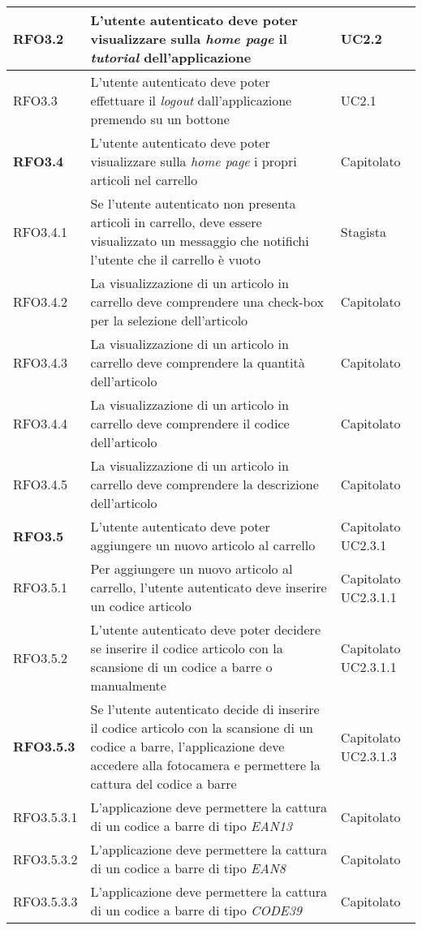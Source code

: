 {\begin{center}
\begin{longtable}{ | >{\centering\arraybackslash}p{2.5cm} | >{\arraybackslash}p{7cm} | >{\centering\arraybackslash}p{2cm} | }
RFO3.2 & L'utente autenticato deve poter visualizzare sulla \textit{home page} il \textit{tutorial} dell'applicazione & UC2.2 \\ \hline
RFO3.3 & L'utente autenticato deve poter effettuare il \textit{logout} dall'applicazione premendo su un bottone & UC2.1 \\ \hline
\textbf{RFO3.4} & L'utente autenticato deve poter visualizzare sulla \textit{home page} i propri articoli nel carrello & Capitolato \\ \hline
RFO3.4.1 & Se l'utente autenticato non presenta articoli in carrello, deve essere visualizzato un messaggio che notifichi l'utente che il carrello è vuoto & Stagista \\ \hline
RFO3.4.2 & La visualizzazione di un articolo in carrello deve comprendere una check-box per la selezione dell'articolo & Capitolato \\ \hline
RFO3.4.3 & La visualizzazione di un articolo in carrello deve comprendere la quantità dell'articolo & Capitolato \\ \hline
RFO3.4.4 & La visualizzazione di un articolo in carrello deve comprendere il codice dell'articolo & Capitolato \\ \hline
RFO3.4.5 & La visualizzazione di un articolo in carrello deve comprendere la descrizione dell'articolo & Capitolato \\ \hline
\textbf{RFO3.5} & L'utente autenticato deve poter aggiungere un nuovo articolo al carrello & Capitolato UC2.3.1 \\ \hline
RFO3.5.1 & Per aggiungere un nuovo articolo al carrello, l'utente autenticato deve inserire un codice articolo & Capitolato UC2.3.1.1 \\ \hline
RFO3.5.2 & L'utente autenticato deve poter decidere se inserire il codice articolo con la scansione di un codice a barre o manualmente & Capitolato UC2.3.1.1 \\ \hline
\textbf{RFO3.5.3} & Se l'utente autenticato decide di inserire il codice articolo con la scansione di un codice a barre, l'applicazione deve accedere alla fotocamera e permettere la cattura del codice a barre & Capitolato UC2.3.1.3 \\ \hline
RFO3.5.3.1 & L'applicazione deve permettere la cattura di un codice a barre di tipo \textit{EAN13} & Capitolato \\ \hline
RFO3.5.3.2 & L'applicazione deve permettere la cattura di un codice a barre di tipo \textit{EAN8} & Capitolato \\ \hline
RFO3.5.3.3 & L'applicazione deve permettere la cattura di un codice a barre di tipo \textit{CODE39} & Capitolato \\ \hline

\end{longtable}
\end{center}}
